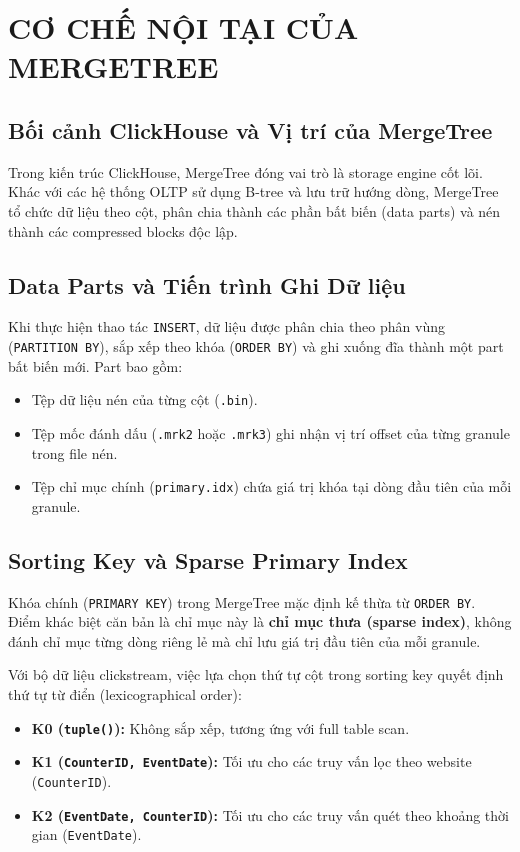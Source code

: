 \section{CƠ CHẾ NỘI TẠI CỦA MERGETREE}
\label{sec:co_che_mergetree}


\subsection{Bối cảnh ClickHouse và Vị trí của MergeTree}
Trong kiến trúc ClickHouse, MergeTree đóng vai trò là storage engine cốt lõi. Khác với các hệ thống OLTP sử dụng B-tree và lưu trữ hướng dòng, MergeTree tổ chức dữ liệu theo cột, phân chia thành các phần bất biến (data parts) và nén thành các compressed blocks độc lập.

\subsection{Data Parts và Tiến trình Ghi Dữ liệu}
Khi thực hiện thao tác \texttt{INSERT}, dữ liệu được phân chia theo phân vùng (\texttt{PARTITION BY}), sắp xếp theo khóa (\texttt{ORDER BY}) và ghi xuống đĩa thành một part bất biến mới. Part bao gồm:
\begin{itemize}
    \item Tệp dữ liệu nén của từng cột (\texttt{.bin}).
    \item Tệp mốc đánh dấu (\texttt{.mrk2} hoặc \texttt{.mrk3}) ghi nhận vị trí offset của từng granule trong file nén.
    \item Tệp chỉ mục chính (\texttt{primary.idx}) chứa giá trị khóa tại dòng đầu tiên của mỗi granule.
\end{itemize}

\subsection{Sorting Key và Sparse Primary Index}
Khóa chính (\texttt{PRIMARY KEY}) trong MergeTree mặc định kế thừa từ \texttt{ORDER BY}. Điểm khác biệt căn bản là chỉ mục này là \textbf{chỉ mục thưa (sparse index)}, không đánh chỉ mục từng dòng riêng lẻ mà chỉ lưu giá trị đầu tiên của mỗi granule.

Với bộ dữ liệu clickstream, việc lựa chọn thứ tự cột trong sorting key quyết định thứ tự từ điển (lexicographical order):
\begin{itemize}
    \item \textbf{K0 (\texttt{tuple()}):} Không sắp xếp, tương ứng với full table scan.
    \item \textbf{K1 (\texttt{CounterID, EventDate}):} Tối ưu cho các truy vấn lọc theo website (\texttt{CounterID}).
    \item \textbf{K2 (\texttt{EventDate, CounterID}):} Tối ưu cho các truy vấn quét theo khoảng thời gian (\texttt{EventDate}).
\end{itemize}

